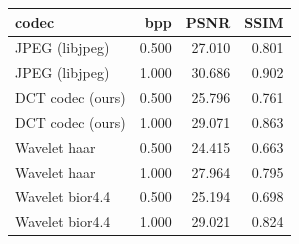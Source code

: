 \begin{tabular}{lrrr}
\toprule
codec & bpp & PSNR & SSIM \\
\midrule
JPEG (libjpeg) & 0.500 & 27.010 & 0.801 \\
JPEG (libjpeg) & 1.000 & 30.686 & 0.902 \\
DCT codec (ours) & 0.500 & 25.796 & 0.761 \\
DCT codec (ours) & 1.000 & 29.071 & 0.863 \\
Wavelet haar & 0.500 & 24.415 & 0.663 \\
Wavelet haar & 1.000 & 27.964 & 0.795 \\
Wavelet bior4.4 & 0.500 & 25.194 & 0.698 \\
Wavelet bior4.4 & 1.000 & 29.021 & 0.824 \\
\bottomrule
\end{tabular}
